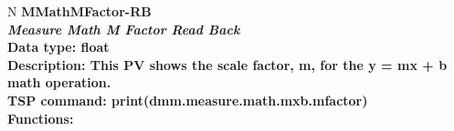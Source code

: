 \documentclass[openany]{article}
\begin{document}
		\begin{tabular}{N}
			\hline
			\bfseries MMathMFactor-RB\label{pv:mmathmfactor-rb} \\ \hline
			\emph{Measure Math M Factor Read Back} \\
			Data type: float \\
			Description: This PV shows the scale factor, m, for the y = mx + b math operation. \\
			TSP command: print(dmm.measure.math.mxb.mfactor) \\
			Functions: \\
			\arrayrulecolor{\FuncTableBorderColor}

		\end{tabular}
\end{document}

